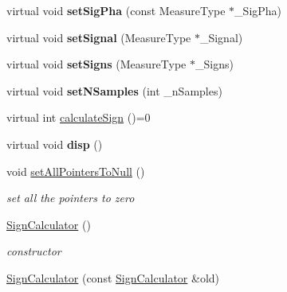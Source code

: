 \begin{DoxyCompactItemize}
\item 
virtual void {\bfseries set\+Sig\+Pha} (const Measure\+Type $\ast$\+\_\+\+Sig\+Pha)\hypertarget{class_ox_1_1_sign_calculator_a1fe78e188915e35e8d0db885642852c9}{}\label{class_ox_1_1_sign_calculator_a1fe78e188915e35e8d0db885642852c9}

\item 
virtual void {\bfseries set\+Signal} (Measure\+Type $\ast$\+\_\+\+Signal)\hypertarget{class_ox_1_1_sign_calculator_ade6aa249b05f92357cb825065be8a203}{}\label{class_ox_1_1_sign_calculator_ade6aa249b05f92357cb825065be8a203}

\item 
virtual void {\bfseries set\+Signs} (Measure\+Type $\ast$\+\_\+\+Signs)\hypertarget{class_ox_1_1_sign_calculator_a3de14f899f64c93df9076fb837e553bf}{}\label{class_ox_1_1_sign_calculator_a3de14f899f64c93df9076fb837e553bf}

\item 
virtual void {\bfseries set\+N\+Samples} (int \+\_\+n\+Samples)\hypertarget{class_ox_1_1_sign_calculator_a8a4f3f8b94fad53d444cf6f1c1191497}{}\label{class_ox_1_1_sign_calculator_a8a4f3f8b94fad53d444cf6f1c1191497}

\item 
virtual int \hyperlink{class_ox_1_1_sign_calculator_a6a85028b70e41f6a60a5b639c468e455}{calculate\+Sign} ()=0
\item 
virtual void {\bfseries disp} ()\hypertarget{class_ox_1_1_sign_calculator_afc55176ad2a81085942e1e98242376bf}{}\label{class_ox_1_1_sign_calculator_afc55176ad2a81085942e1e98242376bf}

\item 
void \hyperlink{class_ox_1_1_sign_calculator_a59de754f72402b4cf7dc2f8766f0a1ff}{set\+All\+Pointers\+To\+Null} ()\hypertarget{class_ox_1_1_sign_calculator_a59de754f72402b4cf7dc2f8766f0a1ff}{}\label{class_ox_1_1_sign_calculator_a59de754f72402b4cf7dc2f8766f0a1ff}

\begin{DoxyCompactList}\small\item\em set all the pointers to zero \end{DoxyCompactList}\item 
\hyperlink{class_ox_1_1_sign_calculator_a1b0a177a5f2c6080d6730ff5fdc384af}{Sign\+Calculator} ()\hypertarget{class_ox_1_1_sign_calculator_a1b0a177a5f2c6080d6730ff5fdc384af}{}\label{class_ox_1_1_sign_calculator_a1b0a177a5f2c6080d6730ff5fdc384af}

\begin{DoxyCompactList}\small\item\em constructor \end{DoxyCompactList}\item 
\hyperlink{class_ox_1_1_sign_calculator_a118469032ecb643b93ba56f948fdce85}{Sign\+Calculator} (const \hyperlink{class_ox_1_1_sign_calculator}{Sign\+Calculator} \&old)\hypertarget{class_ox_1_1_sign_calculator_a118469032ecb643b93ba56f948fdce85}{}\label{class_ox_1_1_sign_calculator_a118469032ecb643b93ba56f948fdce85}


\end{DoxyCompactItemize}

